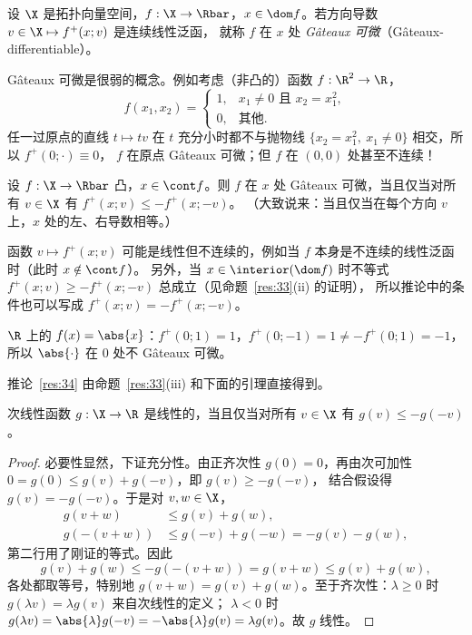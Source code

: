 \begin{definition}[Gâteaux 可微]
\label{def:22}
设 $\X$ 是拓扑向量空间，$f:\X\to\Rbar$，$x\in\dom f$。若方向导数 $v\in\X\mapsto f^+(x;v)$ 是连续线性泛函，
就称 $f$ 在 $x$ 处 \emph{Gâteaux 可微}（Gâteaux-differentiable）。
\end{definition}

\begin{remark}
\label{rem:11}
Gâteaux 可微是很弱的概念。例如考虑（非凸的）函数 $f:\R^2\to\R$，
\[
  f(x_1,x_2)=\begin{cases}1, & x_1\neq0\text{ 且 }x_2=x_1^2,\\ 0, & \text{其他}.\end{cases}
\]
任一过原点的直线 $t\mapsto tv$ 在 $t$ 充分小时都不与抛物线 $\{x_2=x_1^2,\ x_1\ne0\}$ 相交，所以 $f^+(0;\cdot)\equiv0$，
$f$ 在原点 Gâteaux 可微；但 $f$ 在 $(0,0)$ 处甚至不连续！
\end{remark}

\begin{corollary}
\label{res:34}
设 $f:\X\to\Rbar$ 凸，$x\in\cont f$。则 $f$ 在 $x$ 处 Gâteaux 可微，当且仅当对所有 $v\in\X$ 有 $f^+(x;v)\leqslant-f^+(x;-v)$。
（大致说来：当且仅当在每个方向 $v$ 上，$x$ 处的左、右导数相等。）
\end{corollary}

\begin{remark}
\label{rem:12}
函数 $v\mapsto f^+(x;v)$ 可能是线性但不连续的，例如当 $f$ 本身是不连续的线性泛函时（此时 $x\notin\cont f$）。
另外，当 $x\in\interior(\dom f)$ 时不等式 $f^+(x;v)\geqslant-f^+(x;-v)$ 总成立（见命题~\ref{res:33}(ii) 的证明），
所以推论中的条件也可以写成 $f^+(x;v)=-f^+(x;-v)$。
\end{remark}

\begin{example}
\label{exa:14}
$\R$ 上的 $f(x)=\abs{x}$：$f^+(0;1)=1$，$f^+(0;-1)=1\neq-f^+(0;1)=-1$，所以 $\abs{\cdot}$ 在 $0$ 处不 Gâteaux 可微。
\end{example}

推论~\ref{res:34} 由命题~\ref{res:33}(iii) 和下面的引理直接得到。

\begin{lemma}
\label{res:35}
次线性函数 $g:\X\to\R$ 是线性的，当且仅当对所有 $v\in\X$ 有 $g(v)\leqslant-g(-v)$。
\end{lemma}

\begin{proof}
必要性显然，下证充分性。由正齐次性 $g(0)=0$，再由次可加性 $0=g(0)\leqslant g(v)+g(-v)$，即 $g(v)\geqslant-g(-v)$，
结合假设得 $g(v)=-g(-v)$。于是对 $v,w\in\X$，
\begin{align*}
  g(v+w)&\leqslant g(v)+g(w),\\
  g(-(v+w))&\leqslant g(-v)+g(-w)=-g(v)-g(w),
\end{align*}
第二行用了刚证的等式。因此
\[
  g(v)+g(w)\leqslant-g(-(v+w))=g(v+w)\leqslant g(v)+g(w),
\]
各处都取等号，特别地 $g(v+w)=g(v)+g(w)$。至于齐次性：$\lambda\geqslant0$ 时 $g(\lambda v)=\lambda g(v)$ 来自次线性的定义；
$\lambda<0$ 时 $g(\lambda v)=\abs{\lambda}g(-v)=-\abs{\lambda}g(v)=\lambda g(v)$。故 $g$ 线性。
\end{proof}

